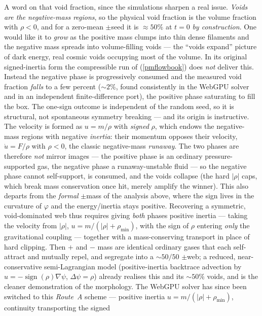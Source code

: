A word on that void fraction, since the simulations sharpen a real issue. \emph{Voids are the negative-mass
regions}, so the physical void fraction is the volume fraction with $\rho<0$, and for a zero-mean $\pm$seed it is
$\approx50\%$ at $t=0$ \emph{by construction}. One would like it to \emph{grow} as the positive mass clumps into
thin dense filaments and the negative mass spreads into volume-filling voids --- the ``voids expand'' picture of
dark energy, real cosmic voids occupying most of the volume. In its original signed-inertia form the compressible
run of (\ref{pmflowbook}) does \emph{not} deliver this. Instead the negative phase is progressively consumed and the measured void fraction
\emph{falls} to a few percent (${\sim}2\%$, found consistently in the WebGPU solver and in an independent
finite-difference port), the positive phase saturating to fill the box. The one-sign outcome is independent of the random seed, so it is
structural, not spontaneous symmetry breaking --- and its origin is instructive. The velocity is formed as
$u=m/\rho$ with \emph{signed} $\rho$, which endows the negative-mass regions with negative \emph{inertia}: their
momentum opposes their velocity, $\dot u=F/\rho$ with $\rho<0$, the classic negative-mass \emph{runaway}. The two
phases are therefore \emph{not} mirror images --- the positive phase is an ordinary pressure-supported gas, the
negative phase a runaway-unstable fluid --- so the negative phase cannot self-support, is consumed, and the voids
collapse (the hard $|\rho|$ caps, which break mass conservation once hit, merely amplify the winner). This also
departs from the \emph{formal} $\pm$mass of the analysis above, where the sign lives in the curvature of $\varphi$
and the energy/inertia stays positive. Recovering a symmetric, void-dominated web thus requires giving \emph{both}
phases positive inertia --- taking the velocity from $|\rho|$, $u=m/(|\rho|+\rho_{\min})$, with the sign of $\rho$
entering \emph{only} the gravitational coupling --- together with a mass-conserving transport in place of hard
clipping. Then $+$ and $-$ mass are identical ordinary gases that each self-attract and mutually repel, and
segregate into a $\sim\!50/50$ $\pm$web; a reduced, near-conservative semi-Lagrangian model (positive-inertia
backtrace advection by $u=-\operatorname{sign}(\rho)\nabla\psi$, $\Delta\psi=\rho$) already realises this and its
$\sim\!50\%$ voids, and is the cleaner demonstration of the morphology. The WebGPU solver has since been switched
to this \emph{Route~A} scheme --- positive inertia $u=m/(|\rho|+\rho_{\min})$, continuity transporting the signed
